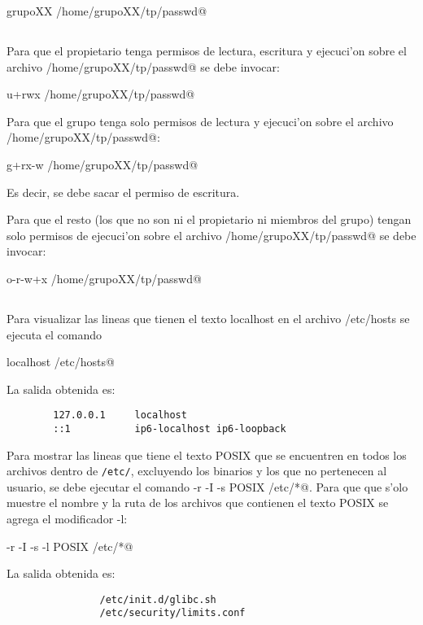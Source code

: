 			\verb@chown grupoXX /home/grupoXX/tp/passwd@

		\subsection{}

			Para que el propietario tenga permisos de lectura, escritura y ejecuci'on sobre el archivo \verb@/home/grupoXX/tp/passwd@ se debe invocar:

			\verb@chmod u+rwx /home/grupoXX/tp/passwd@
		
			Para que el grupo tenga solo permisos de lectura y ejecuci'on sobre el archivo \verb@/home/grupoXX/tp/passwd@:

			\verb@chmod g+rx-w /home/grupoXX/tp/passwd@

			Es decir, se debe sacar el permiso de escritura.
		
			Para que el resto (los que no son ni el propietario ni miembros del grupo) tengan solo permisos de ejecuci'on sobre el archivo \verb@/home/grupoXX/tp/passwd@ se debe invocar:

			\verb@chmod o-r-w+x /home/grupoXX/tp/passwd@

		\subsection{}
			Para visualizar las lineas que tienen el texto localhost en el archivo /etc/hosts se ejecuta el comando

			\verb@grep localhost /etc/hosts@

			La salida obtenida es:
      \begin{mylisting}
			\begin{verbatim}
        127.0.0.1     localhost
        ::1           ip6-localhost ip6-loopback
			\end{verbatim}
      \end{mylisting}
			
			Para mostrar las lineas que tiene el texto POSIX que se encuentren en todos los archivos dentro de \verb|/etc/|, excluyendo los binarios y los que no pertenecen al usuario, se debe ejecutar el comando \verb@grep -r -I -s POSIX /etc/*@.
Para que que s'olo muestre el nombre y la ruta de los archivos que contienen el texto POSIX se agrega el modificador -l:

			\verb@grep -r -I -s -l POSIX /etc/*@

			La salida obtenida es:
			\begin{mylisting}
			\begin{verbatim}
				/etc/init.d/glibc.sh
				/etc/security/limits.conf
			\end{verbatim}
			\end{mylisting}
			
